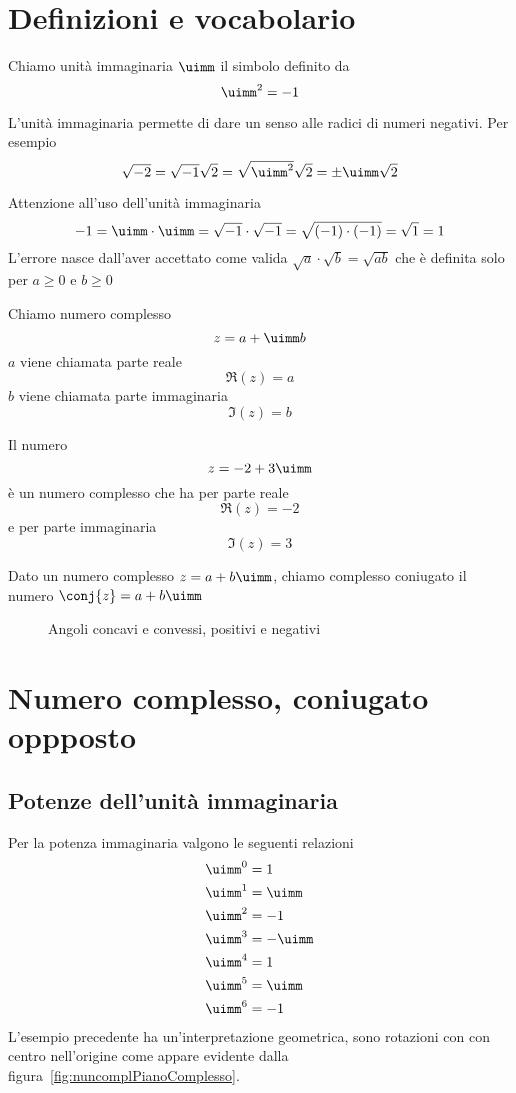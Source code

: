 \section{Definizioni e vocabolario}
\label{sec:NumCompDefinizioniVocabolario}
\begin{definizione}
	Chiamo unità immaginaria $\uimm$ il simbolo definito da \[\uimm^2=-1\]  
\end{definizione}
L'unità immaginaria permette di dare un senso alle radici di numeri negativi. Per esempio \[\sqrt{-2}=\sqrt{-1}\sqrt{2}=\sqrt{\uimm^2}\sqrt{2}=\pm\uimm\sqrt{2}\]
\begin{esempio}
Attenzione all'uso dell'unità immaginaria
\[-1=\uimm\cdot\uimm=\sqrt{-1}\cdot\sqrt{-1}=\sqrt{(-1)\cdot(-1)}=\sqrt{1}=1 \]L'errore nasce dall'aver accettato come valida $\sqrt{a}\cdot\sqrt{b}=\sqrt{ab}$ che è definita solo per $a\geq 0$ e $b\geq 0$
\end{esempio}
\begin{definizione}
	Chiamo numero complesso \[z=a+\uimm b\] $a$ viene chiamata parte reale \[\Re\left(z\right)=a\]
	$b$ viene chiamata parte immaginaria\[\Im\left(z\right)=b \] 
\end{definizione}
\begin{esempio}
Il numero \[z=-2+3\uimm \] è un numero complesso che ha per parte reale \[\Re(z)=-2\]  e per parte immaginaria \[\Im(z)=3\]
\end{esempio}
\begin{definizione}
	Dato un numero complesso $z=a+b\uimm$,  chiamo complesso coniugato il numero $\conj{z}=a+b\uimm$
\end{definizione}

\begin{figure} %
	\centering

	\caption{Angoli concavi e convessi, positivi e negativi}
	\label{fig:numcomplesso}
\end{figure}
\section{Numero complesso, coniugato oppposto}
\label{sec:NumCompOperazioni}
\subsection{Potenze dell'unità immaginaria}
Per la potenza immaginaria valgono le seguenti relazioni
\begin{align*}
	&\uimm^0=1\\
	&\uimm^1=\uimm\\
	&\uimm^2=-1\\
	&\uimm^3=-\uimm\\
	&\uimm^4=1\\
	&\uimm^5=\uimm\\
	&\uimm^6=-1
\end{align*}
L'esempio precedente ha un'interpretazione geometrica, sono rotazioni con con centro nell'origine come appare evidente dalla figura~\vref{fig:nuncomplPianoComplesso}.
